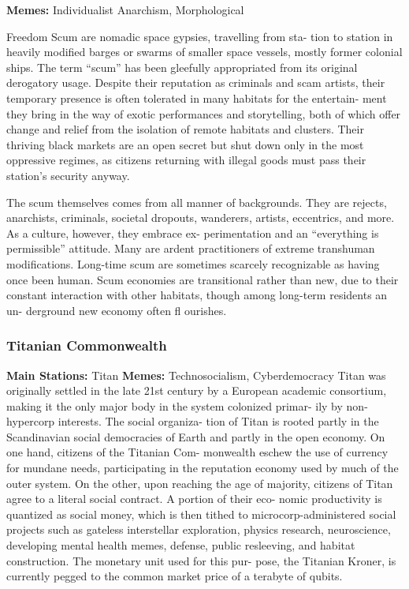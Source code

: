 \textbf{Memes:} Individualist Anarchism, Morphological 

Freedom
Scum are nomadic space gypsies, travelling from sta-
tion to station in heavily modified barges or swarms 
of smaller space vessels, mostly former colonial ships. 
The term ``scum'' has been gleefully appropriated from 
its original derogatory usage. Despite their reputation 
as criminals and scam artists, their temporary presence 
is often tolerated in many habitats for the entertain-
ment they bring in the way of exotic performances 
and storytelling, both of which offer change and relief 
from the isolation of remote habitats and clusters. 
Their thriving black markets are an open secret but 
shut down only in the most oppressive regimes, as 
citizens returning with illegal goods must pass their 
station's security anyway.

The scum themselves comes from all manner of 
backgrounds. They are rejects, anarchists, criminals, 
societal dropouts, wanderers, artists, eccentrics, 
and more. As a culture, however, they embrace ex-
perimentation and an ``everything is permissible'' 
attitude. Many are ardent practitioners of extreme 
transhuman modifications. Long-time scum are 
sometimes scarcely recognizable as having once been 
human. Scum economies are transitional rather than 
new, due to their constant interaction with other 
habitats, though among long-term residents an un-
derground new economy often fl ourishes.

\subsubsection{Titanian Commonwealth}

\textbf{Main Stations:} Titan
\textbf{Memes:} Technosocialism, Cyberdemocracy
Titan was originally settled in the late 21st century 
by a European academic consortium, making it the 
only major body in the system colonized primar-
ily by non-hypercorp interests. The social organiza-
tion of Titan is rooted partly in the Scandinavian 
social democracies of Earth and partly in the open 
economy. On one hand, citizens of the Titanian Com-
monwealth eschew the use of currency for mundane 
needs, participating in the reputation economy used 
by much of the outer system. On the other, upon 
reaching the age of majority, citizens of Titan agree 
to a literal social contract. A portion of their eco-
nomic productivity is quantized as social money, 
which is then tithed to microcorp-administered social 
projects such as gateless interstellar exploration, 
physics research, neuroscience, developing mental 
health memes, defense, public resleeving, and habitat 
construction. The monetary unit used for this pur-
pose, the Titanian Kroner, is currently pegged to the 
common market price of a terabyte of qubits.

